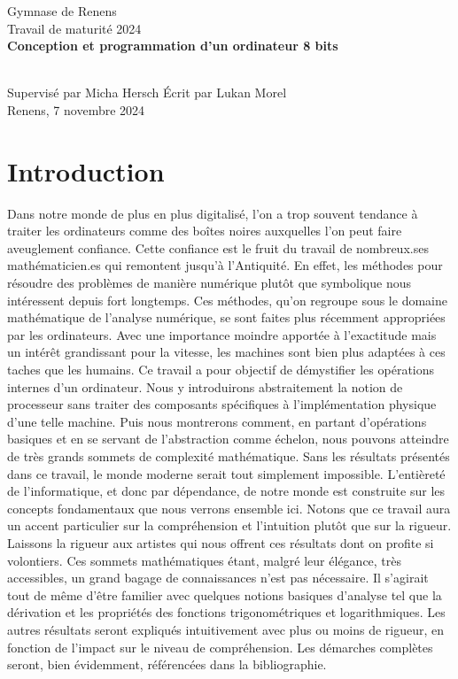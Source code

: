 \documentclass{article}
\begin{document}
\begin{titlepage}
\begin{center}
    \LARGE
    Gymnase de Renens
    \vspace{2cm} \ \\
    Travail de maturité 2024
    \vspace{5cm} \ \\
    \Huge
    \textbf{Conception et programmation d'un ordinateur 8 bits}
\end{center}
\Large
\vspace{5cm} \ \\
Supervisé par Micha Hersch
\hfill
Écrit par Lukan Morel
\vspace{2cm} \ \\
Renens, 7 novembre 2024
\end{titlepage}
\pagebreak
{}
\pagestyle{fancy}
\cfoot{}
\tableofcontents
\newpage
\section{Introduction}
Dans notre monde de plus en plus digitalisé, l'on a trop souvent tendance à traiter les ordinateurs comme des boîtes noires auxquelles l'on peut faire aveuglement confiance. Cette confiance est le fruit du travail de nombreux.ses mathématicien.es qui remontent jusqu'à l'Antiquité. En effet, les méthodes pour résoudre des problèmes de manière numérique plutôt que symbolique nous intéressent depuis fort longtemps. Ces méthodes, qu'on regroupe sous le domaine mathématique de l'analyse numérique, se sont faites plus récemment appropriées par les ordinateurs. Avec une importance moindre apportée à l'exactitude mais un intérêt grandissant pour la vitesse, les machines sont bien plus adaptées à ces taches que les humains.
Ce travail a pour objectif de démystifier les opérations internes d'un ordinateur.
Nous y introduirons abstraitement la notion de processeur sans traiter des composants spécifiques à l'implémentation physique d'une telle machine. 
Puis nous montrerons comment, en partant d'opérations basiques et en se servant de l'abstraction comme échelon, nous pouvons atteindre de très grands sommets de complexité mathématique. Sans les résultats présentés dans ce travail, le monde moderne serait tout simplement impossible. L'entièreté de l'informatique, et donc par dépendance, de notre monde est construite sur les concepts fondamentaux que nous verrons ensemble ici. Notons que ce travail aura un accent particulier sur la compréhension et l'intuition plutôt que sur la rigueur. Laissons la rigueur aux artistes qui nous offrent ces résultats dont on profite si volontiers.
Ces sommets mathématiques étant, malgré leur élégance, très accessibles, un grand bagage de connaissances n'est pas nécessaire. Il s'agirait tout de même d'être familier avec quelques notions basiques d'analyse tel que la dérivation et les propriétés des fonctions trigonométriques et logarithmiques. Les autres résultats seront expliqués intuitivement avec plus ou moins de rigueur, en fonction de l'impact sur le niveau de compréhension. Les démarches complètes seront, bien évidemment, référencées dans la bibliographie.
\end{document}
